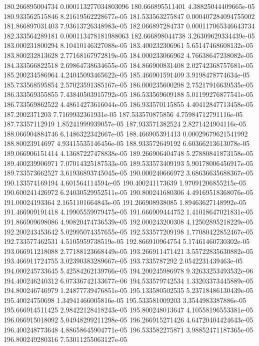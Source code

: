 {180.266895004734 0.000113277034803096
180.666895511401 4.38825044409665e-05
180.933562515846 8.21619562228677e-05
181.533563275847 0.000407284094755002
181.866897031403 7.93613726348983e-05
182.066897284737 0.000117065346643734
182.333564289181 0.000113478181988063
182.666898044738 3.26309629334439e-05
183.000231800294 8.10410146327088e-05
183.400232306961 5.65147468608132e-05
183.800232813628 2.77168167972819e-05
184.000233066962 4.76638647238082e-05
184.333566822518 2.69864738634655e-05
184.866900831408 2.02742368757681e-05
185.200234586964 4.24045093465622e-05
185.466901591409 3.9198478774634e-05
185.733568595854 2.57023591385167e-05
186.000235600298 2.75217916639535e-05
186.333569355855 7.43840503915792e-05
186.533569609188 5.01199276877541e-05
186.733569862522 4.48614273616044e-05
186.933570115855 4.40412847713458e-05
187.2002371203 7.7169932361931e-05
187.533570875856 4.75984712791116e-05
187.73357112919 1.85241999939057e-05
187.933571382524 2.8271424904116e-05
188.066904884746 6.1486322342667e-05
188.466905391413 0.00029679621541992
188.80023914697 4.93415535146456e-05
188.933572649192 6.60366213613078e-05
189.066906151414 4.13687227478838e-05
189.266906404748 5.27880841873158e-05
189.400239906971 7.07014325187533e-05
189.533573409193 5.90178006456917e-05
189.733573662527 3.61936893745045e-05
190.000240666972 3.68636635688367e-05
190.133574169194 4.601564114594e-05
190.400241173639 1.97091206855215e-05
190.600241426972 6.24030529952511e-05
190.800241680306 4.49169518368076e-05
191.00024193364 2.1651101664843e-05
191.266908938085 1.89463627148992e-05
191.466909191418 4.19905559979475e-05
191.666909444752 1.41018647021831e-05
191.866909698086 4.90820474736539e-05
192.000243200308 4.12502895218229e-05
192.200243453642 5.02995074357655e-05
192.533577209198 1.77080422852467e-05
192.733577462531 4.5105959738519e-05
192.866910964754 5.17461460730302e-05
193.066911218088 2.77188123668449e-05
193.266911471421 3.55722835630882e-05
193.466911724755 3.02390383289667e-05
193.7335787292 2.0542231439463e-05
194.000245733645 5.42584262139766e-05
194.200245986978 9.32633253493532e-06
194.400246240312 6.07336742133677e-06
194.533579742534 1.33203373445889e-05
194.800246746979 1.24877739476851e-05
195.133580502535 5.23718486130439e-05
195.40024750698 1.34941466005816e-05
195.533581009203 3.3544983387886e-05
195.666914511425 2.98422128418243e-05
195.800248013647 4.10558196553381e-05
196.066915018092 5.04948299211298e-05
196.266915271426 4.64720404424643e-05
196.400248773648 4.88658645904771e-05
196.533582275871 3.98852471187365e-05
196.800249280316 7.53011255063127e-05
}
